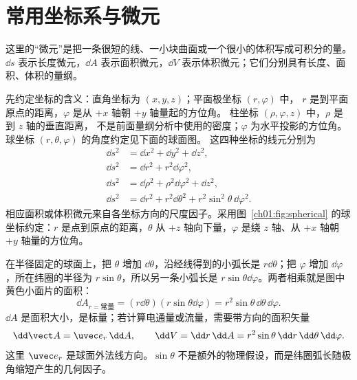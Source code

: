 \section{常用坐标系与微元}

这里的“微元”是把一条很短的线、一小块曲面或一个很小的体积写成可积分的量。$\dd s$ 表示长度微元，$\dd A$ 表示面积微元，$\dd V$ 表示体积微元；它们分别具有长度、面积、体积的量纲。

先约定坐标的含义：直角坐标为 $(x,y,z)$；平面极坐标 $(r,\varphi)$ 中，
$r$ 是到平面原点的距离，$\varphi$ 是从 $+x$ 轴朝 $+y$ 轴量起的方位角。
柱坐标 $(\rho,\varphi,z)$ 中，$\rho$ 是到 $z$ 轴的垂直距离，
不是前面量纲分析中使用的密度；$\varphi$ 为水平投影的方位角。
球坐标 $(r,\theta,\varphi)$ 的角度约定见下面的球面图。
这四种坐标的线元分别为
\begin{align}
 \dd s^2&=\dd x^2+\dd y^2+\dd z^2,\\
 \dd s^2&=\dd r^2+r^2\dd\varphi^2,\\
 \dd s^2&=\dd \rho^2+\rho^2\dd\varphi^2+\dd z^2,\\
 \dd s^2&=\dd r^2+r^2\dd\theta^2+r^2\sin^2\theta\,\dd\varphi^2.
\end{align}
相应面积或体积微元来自各坐标方向的尺度因子。采用图~\ref{ch01:fig:spherical} 的球坐标约定：$r$ 是点到原点的距离，$\theta$ 从 $+z$ 轴向下量，$\varphi$ 是绕 $z$ 轴、从 $+x$ 轴朝 $+y$ 轴量的方位角。

在半径固定的球面上，把 $\theta$ 增加 $\dd\theta$，沿经线得到的小弧长是 $r\dd\theta$；把 $\varphi$ 增加 $\dd\varphi$，所在纬圈的半径为 $r\sin\theta$，所以另一条小弧长是 $r\sin\theta\dd\varphi$。两者相乘就是图中黄色小面片的面积：
\begin{equation}
 \boxed{\dd A_{r=\text{常量}}
 =(r\dd\theta)(r\sin\theta\dd\varphi)
 =r^2\sin\theta\,\dd\theta\,\dd\varphi}.
\end{equation}
$\dd A$ 是面积大小，是标量；若计算电通量或流量，需要带方向的面积矢量
\begin{equation}
 \dd\vect A=\uvec e_r\,\dd A,
 \qquad
 \dd V=\dd r\,\dd A
 =r^2\sin\theta\,\dd r\,\dd\theta\,\dd\varphi.
\end{equation}
这里 $\uvec e_r$ 是球面外法线方向。$\sin\theta$ 不是额外的物理假设，而是纬圈弧长随极角缩短产生的几何因子。

